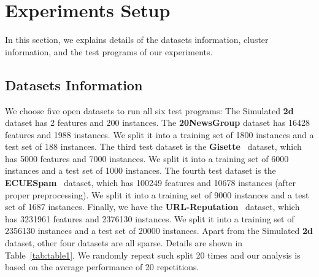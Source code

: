 \documentclass[10pt, conference, compsocconf]{IEEEtran}
\begin{document}
\section{Experiments Setup} \label{sec:setup}
In this section, we explains details of the datasets information, cluster information, and the test programs of our experiments.

\subsection{Datasets Information}
We choose five open datasets to run all six test programs:	
The	Simulated \textbf{2d} dataset has 2 features and 200 instances.
The	\textbf{20NewsGroup} dataset has 16428 features and 1988 instances. We split it into a training set of 1800 instances and a test set of 188 instances.	
The	third test dataset is the \textbf{Gisette}~\cite{guyon2004result} dataset, which has 5000 features and 7000 instances. We split it into a training set of 6000 instances and a test set of 1000 instances.
The	fourth test dataset is the \textbf{ECUESpam}~\cite{DelanyKBS05} dataset, which has 100249 features and 10678 instances (after proper preprocessing). We split it into a training set of 9000 instances and a test set of 1687 instances.
Finally, we have the \textbf{URL-Reputation}~\cite{ma2009identifying} dataset, which has 3231961 features and 2376130 instances.
We split it into a training set of 2356130 instances and a test set of 20000 instances.
Apart from the Simulated \textbf{2d} dataset, other four datasets are all sparse. Details are shown in Table~\ref{tab:table1}.
We randomly repeat such split 20 times and our analysis is based on the average performance of 20 repetitions.
\end{document}
